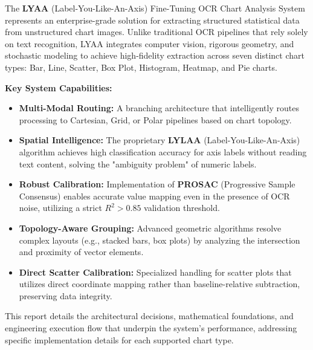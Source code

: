 \documentclass[11pt, a4paper]{report}
\begin{document}
The \textbf{LYAA} (Label-You-Like-An-Axis) Fine-Tuning OCR Chart Analysis System represents an enterprise-grade solution for extracting structured statistical data from unstructured chart images. Unlike traditional OCR pipelines that rely solely on text recognition, LYAA integrates computer vision, rigorous geometry, and stochastic modeling to achieve high-fidelity extraction across seven distinct chart types: Bar, Line, Scatter, Box Plot, Histogram, Heatmap, and Pie charts.

\textbf{Key System Capabilities:}
\begin{itemize}
    \item \textbf{Multi-Modal Routing:} A branching architecture that intelligently routes processing to Cartesian, Grid, or Polar pipelines based on chart topology.
    \item \textbf{Spatial Intelligence:} The proprietary \textbf{LYLAA} (Label-You-Like-An-Axis) algorithm achieves high classification accuracy for axis labels without reading text content, solving the "ambiguity problem" of numeric labels.
    \item \textbf{Robust Calibration:} Implementation of \textbf{PROSAC} (Progressive Sample Consensus) enables accurate value mapping even in the presence of OCR noise, utilizing a strict $R^2 > 0.85$ validation threshold.
    \item \textbf{Topology-Aware Grouping:} Advanced geometric algorithms resolve complex layouts (e.g., stacked bars, box plots) by analyzing the intersection and proximity of vector elements.
    \item \textbf{Direct Scatter Calibration:} Specialized handling for scatter plots that utilizes direct coordinate mapping rather than baseline-relative subtraction, preserving data integrity.
\end{itemize}

This report details the architectural decisions, mathematical foundations, and engineering execution flow that underpin the system's performance, addressing specific implementation details for each supported chart type.

\tableofcontents

\end{document}
